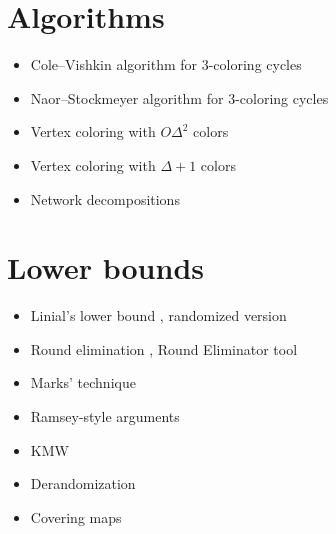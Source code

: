 \documentclass[a4paper,11pt]{article}
\begin{document}
\section{Algorithms}
\begin{itemize}
    \item Cole--Vishkin algorithm for 3-coloring cycles \cite{cole-vishkin-1986-deterministic-coin-tossing-with,goldberg-plotkin-shannon-1988-parallel-symmetry}
    \item Naor--Stockmeyer algorithm for 3-coloring cycles \cite{naor-stockmeyer-1995-what-can-be-computed-locally}
    \item Vertex coloring with $O\Delta^2$ colors \cite{linial-1992-locality-in-distributed-graph-algorithms}
    \item Vertex coloring with $\Delta+1$ colors \cite{maus-tonoyan-2022-linial-for-lists,barenboim-elkin-goldenberg-2022-locally-iterative}
    \item Network decompositions \cite{awerbuch-goldberg-etal-1989-network-decomposition-and,rozhon-ghaffari-2020-polylogarithmic-time-deterministic}
\end{itemize}

\section{Lower bounds}
\begin{itemize}
    \item Linial's lower bound \cite{linial-1992-locality-in-distributed-graph-algorithms}, randomized version \cite{naor-1991-a-lower-bound-on-probabilistic-algorithms-for}
    \item Round elimination \cite{brandt-2019-an-automatic-speedup-theorem-for,brandt-fischer-etal-2016-a-lower-bound-for-the}, Round Eliminator tool \cite{olivetti-2020-brief-announcement-round-eliminator-a,olivetti-2025-round-eliminator-a-tool-for-automatic}
    \item Marks' technique \cite{marks-2016-a-determinacy-approach-to-borel,brandt-chang-etal-2022-local-problems-on-trees-from-the}
    \item Ramsey-style arguments \cite{naor-stockmeyer-1995-what-can-be-computed-locally,czygrinow-hanckowiak-wawrzyniak-2008-fast-distributed}
    \item KMW \cite{kuhn-moscibroda-wattenhofer-2004-what-cannot-be,kuhn-moscibroda-wattenhofer-2006-the-price-of-being,kuhn-moscibroda-wattenhofer-2016-local-computation,coupette-lenzen-2021-a-breezing-proof-of-the-kmw-bound}
    \item Derandomization \cite{naor-stockmeyer-1995-what-can-be-computed-locally,chang-kopelowitz-pettie-2019-an-exponential-separation,dahal-d-amore-etal-2023-brief-announcement-distributed}
    \item Covering maps \cite{angluin-1980-local-and-global-properties-in-networks-of,yamashita-kameda-1996-computing-on-anonymous-networks}
\end{itemize}
\end{document}
